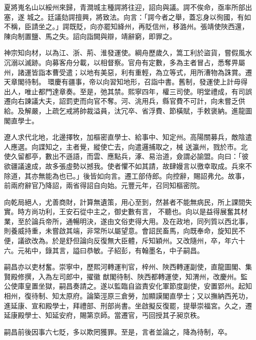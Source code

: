 \begin{pinyinscope}
 夏將嵬名山以綏州來歸，青澗城主種諤將往迎，詔向與議。諤不俟命，亟率所部出塞，遂
 城之。廷議劾諤擅興，將致法。向言：「諤今者之舉，蓋忘身以徇國，有如不稱，臣請坐之。」諤既貶，向亦罷知絳州，再貶信州，移潞州。張靖使陜西還，陳向制置鹽、馬之失。詔向詣闕與辯，靖辭窮，即罪之。



 神宗知向材，以為江、浙、荊、淮發運使。綱舟歷歲久，篙工利於盜貨，嘗假風水沉溺以滅跡。向募客舟分載，以相督察。官舟有定數，多為主者冒占，悉奪畀屬州，諸運皆詣本曹受遣；以地有美惡，利有重輕，為立等式，用所漕物為誅賞。遷天章閣待制。
 環慶有疆事，帝以向習知地形，召詣中書。舊制，發運使上計毋得出人，唯止都門達章奏。至是，弛其禁。熙寧四年，權三司使。明堂禮成，有司誤遷向右諫議大夫，詔罰吏而向官不奪。河、洮用兵，縣官費不可計，向未嘗乏供給。及解嚴，上疏乞戒將帥裁溢員，汰冗卒、省浮費、節橫賦，手敕褒納。進龍圖閣直學士。



 遼人求代北地，北邊擇牧，加樞密直學士、給事中、知定州。高陽關募兵，敵陰遣人應選。向諜知之，主者覺，縱使亡去，向遣邏捕取之，械
 送瀛州，戮於市。北使久留都亭，數出不遜語，而雲、應點兵，涿、易治道，僉謂必諭盟。向曰：「彼欲疆議速成，故多張虛勢以撼我。使者懼不如其請，故肆嫚言以徼幸取成。兵來不除道，其亦無能為也已。」後皆如向言。遷工部侍郎。向控辭，賜詔弗允。故事，前兩府辭官乃降詔，兩省得詔自向始。元豐元年，召同知樞密院。



 向乾局絕人，尤善商財，計算無遺策，用心至到，然甚者不能無病民，所上課間失實。時方尚功利，王安石從中主之，御史數有言，
 不聽也。向以是益得展奮其材業，至於論兵帝所，通暢明決，遂由文俗吏得大用。及在政地，同列質以西北事，則養威持重，未嘗啟其端，非常所以屬望意。會詔民畜馬，向既奉命，旋知民不便，議欲改為。於是舒但論向反復無大臣體，斥知穎州。又改隨州，卒，年六十六。元祐中，錄其言，謚曰恭敏。子紹彭，有翰墨名，中子嗣昌。



 嗣昌亦以吏材奮。崇寧中，歷熙河轉運判官，梓州、陜西轉運副使，直龍圖閣、集賢殿修撰，入為左司郎中，擢徽
 猷閣待制、陜西都轉運使，知渭州，改慶州。監公使庫皇置坐獄，嗣昌奏請之。遂以監臨自盜責安化軍節度副使，安置郢州。起知相州，復待制、知太原府。論築涇原三倉勞，加顯謨閣直學士；又以撫納西羌功，進延康、宣和殿學士，拜禮部、刑部尚書。坐啟擬反復罷，提舉崇福宮。久之，遷延康殿學士、知延安府，賜第京師。當遷官，丐回授其子昶京秩。



 嗣昌前後因事六七貶，多以欺罔獲罪。至是，言者並論之，降為待制，卒。




\end{pinyinscope}

